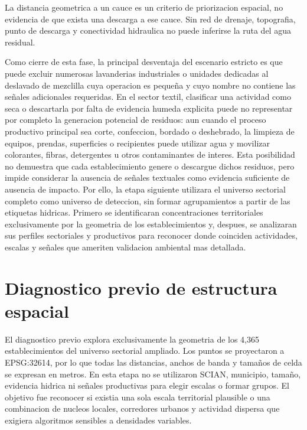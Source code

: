 \documentclass[11pt,letterpaper]{article}
\begin{document}
\begin{alerta}
La distancia geometrica a un cauce es un criterio de priorizacion espacial, no evidencia de que exista una descarga a ese cauce. Sin red de drenaje, topografia, punto de descarga y conectividad hidraulica no puede inferirse la ruta del agua residual.
\end{alerta}

Como cierre de esta fase, la principal desventaja del escenario estricto es que puede excluir numerosas lavanderias industriales o unidades dedicadas al deslavado de mezclilla cuya operacion es pequeña y cuyo nombre no contiene las señales adicionales requeridas. En el sector textil, clasificar una actividad como seca o descartarla por falta de evidencia humeda explicita puede no representar por completo la generacion potencial de residuos: aun cuando el proceso productivo principal sea corte, confeccion, bordado o deshebrado, la limpieza de equipos, prendas, superficies o recipientes puede utilizar agua y movilizar colorantes, fibras, detergentes u otros contaminantes de interes. Esta posibilidad no demuestra que cada establecimiento genere o descargue dichos residuos, pero impide considerar la ausencia de señales textuales como evidencia suficiente de ausencia de impacto. Por ello, la etapa siguiente utilizara el universo sectorial completo como universo de deteccion, sin formar agrupamientos a partir de las etiquetas hidricas. Primero se identificaran concentraciones territoriales exclusivamente por la geometria de los establecimientos y, despues, se analizaran sus perfiles sectoriales y productivos para reconocer donde coinciden actividades, escalas y señales que ameriten validacion ambiental mas detallada.

\section{Diagnostico previo de estructura espacial}

El diagnostico previo explora exclusivamente la geometria de los 4,365 establecimientos del universo sectorial ampliado. Los puntos se proyectaron a EPSG:32614, por lo que todas las distancias, anchos de banda y tamaños de celda se expresan en metros. En esta etapa no se utilizaron SCIAN, municipio, tamaño, evidencia hidrica ni señales productivas para elegir escalas o formar grupos. El objetivo fue reconocer si existia una sola escala territorial plausible o una combinacion de nucleos locales, corredores urbanos y actividad dispersa que exigiera algoritmos sensibles a densidades variables.
\end{document}
